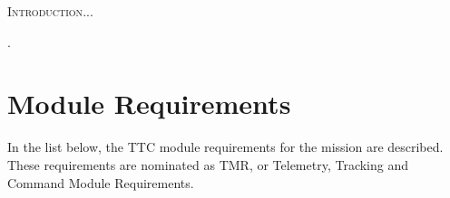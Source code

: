 \documentclass[12pt]{book}
\begin{document}

\lettrine{I}{ntroduction}...


\cite{site}.

\cite{github}

\section{Module Requirements}

In the list below, the TTC module requirements for the mission are described. These requirements are nominated as TMR, or Telemetry, Tracking and Command Module Requirements.
\end{document}
